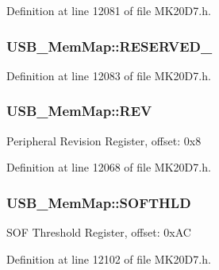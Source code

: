 Definition at line 12081 of file M\+K20\+D7.\+h.

\subsubsection[{\texorpdfstring{R\+E\+S\+E\+R\+V\+E\+D\+\_\+9}{RESERVED_9}}]{ U\+S\+B\+\_\+\+Mem\+Map\+::\+R\+E\+S\+E\+R\+V\+E\+D\+\_}\hypertarget{struct_u_s_b___mem_map_a8cf596bc61a140ce18ef0d4a64fd1697}{}\label{struct_u_s_b___mem_map_a8cf596bc61a140ce18ef0d4a64fd1697}


Definition at line 12083 of file M\+K20\+D7.\+h.

\subsubsection[{\texorpdfstring{R\+EV}{REV}}]{ U\+S\+B\+\_\+\+Mem\+Map\+::\+R\+EV}\hypertarget{struct_u_s_b___mem_map_ac918187248616aac7e5223124ea9610d}{}\label{struct_u_s_b___mem_map_ac918187248616aac7e5223124ea9610d}
Peripheral Revision Register, offset\+: 0x8 

Definition at line 12068 of file M\+K20\+D7.\+h.

\subsubsection[{\texorpdfstring{S\+O\+F\+T\+H\+LD}{SOFTHLD}}]{ U\+S\+B\+\_\+\+Mem\+Map\+::\+S\+O\+F\+T\+H\+LD}\hypertarget{struct_u_s_b___mem_map_a5462ecd3a3fe1425826815c78bfb8120}{}\label{struct_u_s_b___mem_map_a5462ecd3a3fe1425826815c78bfb8120}
S\+OF Threshold Register, offset\+: 0x\+AC 

Definition at line 12102 of file M\+K20\+D7.\+h.

